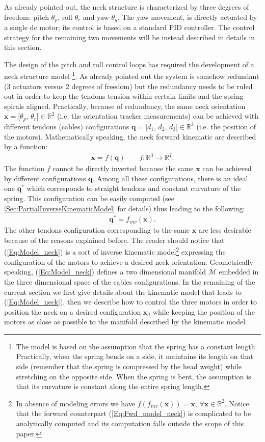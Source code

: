 \documentclass[conference]{IEEEtran}
\numberwithin{equation}{section}
\newcommand{\q}{\mathbf{q}}
\newcommand{\x}{\mathbf{x}}
\begin{document}
As already pointed out, the neck structure is characterized by three degrees of freedom: pitch $\theta_p$, roll $\theta_r$ and yaw $\theta_y$. The yaw movement, is directly actuated by a single dc motor; its control is based on a standard PID controller. The control strategy for the remaining two movements will be instead described in details in this section.

The design of the pitch and roll control loops has required the development of a neck structure model \footnote{The model is based on the assumption that the spring has a constant length. Practically, when the spring bends on a side, it maintains its length on that side (remember that the spring is compressed by the head weight) while stretching on the opposite side. When the spring is bent, the assumption is that its curvature is constant along the entire spring length.}.
As already pointed out the system is somehow redundant (3 actuators versus 2 degrees of freedom) but the redundancy needs to be ruled out in order to keep the tendons tension within certain limits and the spring spirals aligned. Practically, because of redundancy, the same neck orientation $\x = [\theta_p$, $\theta_r] \in \mathbb R^2$ (i.e. the orientation tracker measurements) can be achieved with different tendons (cables) configurations $\q = [d_1$, $d_2$, $d_3] \in \mathbb R^3$ (i.e. the position of the motors). Mathematically speaking, the neck forward kinematic are described by a function:
\begin{eqnarray} \label{Eq:Fwd_model_neck}
\x = f (\q) \qquad f:\mathbb{R}^3 \rightarrow \mathbb{R}^2.
\end{eqnarray}
The function $f$ cannot be directly inverted because the same $\x$ can be achieved by different configurations $\q$. Among all these configurations, there is an ideal one $\q^*$ which corresponds to straight tendons and constant curvature of the spring. This configuration can be easily computed (see \ref{Sec:PartialInverseKinematicModel} for details) thus leading to the following:
\begin{eqnarray} \label{Eq:Model_neck}
\q^* = f_{inv} (\x).
\end{eqnarray}
The other tendons configuration corresponding to the same $\x$ are less desirable because of the reasons explained before. The reader should notice that (\ref{Eq:Model_neck}) is a sort of inverse kinematic model\footnote{In absence of modeling errors we have $f(f_{inv}(\x)) = \x$, $\forall \x \in \mathbb R^2$. Notice that the forward counterpart (\ref{Eq:Fwd_model_neck}) is  complicated to be analytically computed and its computation falls outside the scope of this paper.} expressing the configuration of the motors to achieve a desired neck orientation. Geometrically speaking, (\ref{Eq:Model_neck}) defines a two dimensional manifold $\mathcal M$ embedded in the three dimensional space of the cables configurations.
In the remaining of the current section we first give details about the kinematic model that leads to (\ref{Eq:Model_neck}), then we describe how to control the three motors in order to position the neck on a desired configuration $\x_d$ while keeping the position of the motors as close as possible to the manifold described by the kinematic model.
\end{document}
